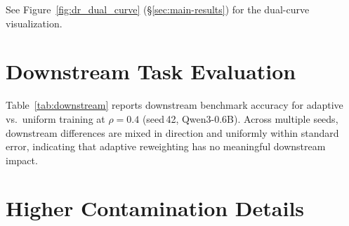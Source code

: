 See Figure~\ref{fig:dr_dual_curve} (\S\ref{sec:main-results}) for the dual-curve visualization.

\section{Downstream Task Evaluation}
\label{app:downstream}

Table~\ref{tab:downstream} reports downstream benchmark accuracy for adaptive vs.\ uniform training at $\rho{=}0.4$ (seed\,42, Qwen3-0.6B).
Across multiple seeds, downstream differences are mixed in direction and uniformly within standard error, indicating that adaptive reweighting has no meaningful downstream impact.

\begin{table}[h]
\centering
\small
{}
\caption{Downstream benchmarks (Qwen3-0.6B, $\rho{=}0.4$).
Seed\,42 used a checkpoint-resumed adaptive model; from-scratch seeds (123, 456) show mixed direction with mean $|\Delta| \leq 0.01$.
All differences within standard error ($\pm 0.01$).
Models use $\tau{=}0.8$; $\tau{=}0.7$ yields identical 3-seed means (0.5414).}
\label{tab:downstream}
\end{table}

\section{Higher Contamination Details}
\label{app:rho06}

